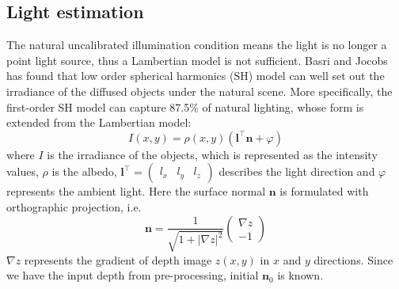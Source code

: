 \subsection{Light estimation}
The natural uncalibrated illumination condition means the light is no longer a point light source, thus a Lambertian model is not sufficient. 
Basri and Jocobs~\cite{basri2003lambertian} has found that low order spherical harmonics (SH) model can well set out the irradiance of the diffused objects under the natural scene.
More specifically, the first-order SH model can capture 87.5\% of natural lighting, whose form is extended from the Lambertian model:
\begin{equation}\label{eq:rgbd_light_model}
I(x,y) = \rho(x,y)(\mathbf{l}^\top \mathbf{n} + \varphi)
\end{equation}
where $I$ is the irradiance of the objects, which is represented as the intensity values, $\rho$ is the albedo, $\mathbf{l}^\top = \begin{pmatrix} l_x & l_y & l_z \end{pmatrix}$ describes the light direction and $\varphi$ represents the ambient light.
Here the surface normal $\mathbf{n}$ is formulated with orthographic projection, i.e. 
\begin{equation}
	\mathbf{n} = \frac{1}{\sqrt{1 + |\nabla z|^2}}
	\begin{pmatrix} 
		 \nabla z\\ 
		 -1
	 \end{pmatrix}
\end{equation}
$\nabla z$ represents the gradient of depth image $z(x,y)$ in $x$ and $y$ directions.
Since we have the input depth from pre-processing, initial $\mathbf{n}_0$ is known.

